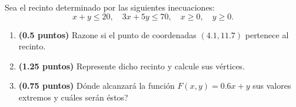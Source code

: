 
Sea el recinto determinado por las siguientes inecuaciones:
\[
x+y\leq20,\quad3x+5y\leq70,\quad x\geq0,\quad y\geq0.
\]
\begin{enumerate}[label=\alph*)]
\item \textbf{(0.5 puntos)} Razone si el punto de coordenadas $(4.1,11.7)$ pertenece al recinto.
\item \textbf{(1.25 puntos)} Represente dicho recinto y calcule sus vértices.
\item \textbf{(0.75 puntos)} \textquestiondown{}Dónde alcanzará la función $F(x,y)=0.6x+y$ sus valores extremos y cuáles serán éstos?
\end{enumerate}
